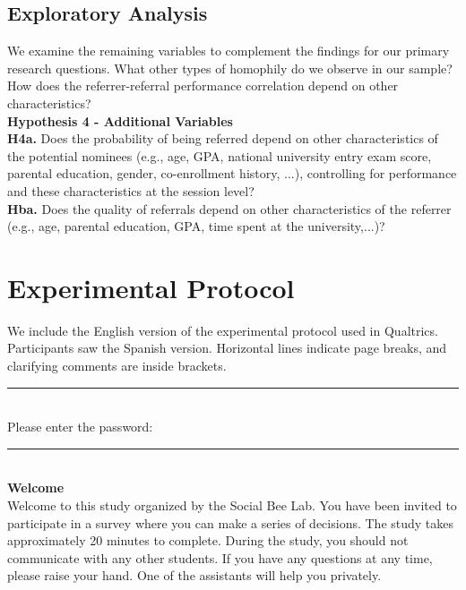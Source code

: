 \documentclass[11pt,a4paper,oneside]{article}
\begin{document}
\subsection{Exploratory Analysis}
We examine the remaining variables to complement the findings for our primary research questions. What other types of homophily do we observe in our sample? How does the referrer-referral performance correlation depend on other characteristics?     \\

\noindent\textbf{Hypothesis 4 - Additional Variables}\\
\noindent\textbf{H4a.} Does the probability of being referred depend on other characteristics of the potential nominees (e.g., age, GPA, national university entry exam score, parental education, gender, co-enrollment history, ...), controlling for performance and these characteristics at the session level? \\
\noindent\textbf{Hba.} Does the quality of referrals depend on other characteristics of the referrer (e.g., age, parental education, GPA, time spent at the university,...)? \\




\appendix
\section{Experimental Protocol}
We include the English version of the experimental protocol used in Qualtrics. Participants saw the Spanish version. Horizontal lines indicate page breaks, and clarifying comments are inside brackets.

\noindent\rule{\textwidth}{0.4pt}\\

\noindent Please enter the password:


\noindent\rule{\textwidth}{0.4pt} \\

\noindent\textbf{Welcome}\\

\noindent Welcome to this study organized by the Social Bee Lab. You have been invited to participate in a survey where you can make a series of decisions. The study takes approximately 20 minutes to complete. During the study, you should not communicate with any other students. If you have any questions at any time, please raise your hand. One of the assistants will help you privately. \\
\end{document}
